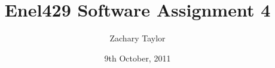 \documentclass[a4paper]{report}   %
\begin{document}
\title{Enel429 Software Assignment 4}   %
\author{Zachary Taylor}         %
\date{9th October, 2011}    %
\maketitle












\end{document}
